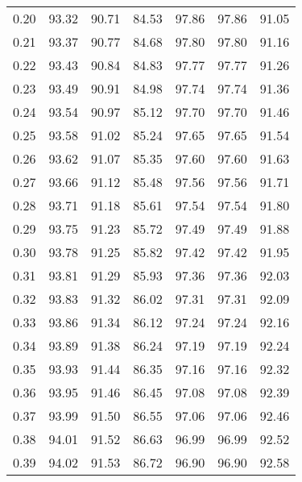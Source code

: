 \begin{tabular}{|c|c|c|c|c|c|c|}
      0.20 &     93.32 &     90.71 &      84.53 &   97.86 &      97.86 &         91.05 \\
      0.21 &     93.37 &     90.77 &      84.68 &   97.80 &      97.80 &         91.16 \\
      0.22 &     93.43 &     90.84 &      84.83 &   97.77 &      97.77 &         91.26 \\
      0.23 &     93.49 &     90.91 &      84.98 &   97.74 &      97.74 &         91.36 \\
      0.24 &     93.54 &     90.97 &      85.12 &   97.70 &      97.70 &         91.46 \\
      0.25 &     93.58 &     91.02 &      85.24 &   97.65 &      97.65 &         91.54 \\
      0.26 &     93.62 &     91.07 &      85.35 &   97.60 &      97.60 &         91.63 \\
      0.27 &     93.66 &     91.12 &      85.48 &   97.56 &      97.56 &         91.71 \\
      0.28 &     93.71 &     91.18 &      85.61 &   97.54 &      97.54 &         91.80 \\
      0.29 &     93.75 &     91.23 &      85.72 &   97.49 &      97.49 &         91.88 \\
      0.30 &     93.78 &     91.25 &      85.82 &   97.42 &      97.42 &         91.95 \\
      0.31 &     93.81 &     91.29 &      85.93 &   97.36 &      97.36 &         92.03 \\
      0.32 &     93.83 &     91.32 &      86.02 &   97.31 &      97.31 &         92.09 \\
      0.33 &     93.86 &     91.34 &      86.12 &   97.24 &      97.24 &         92.16 \\
      0.34 &     93.89 &     91.38 &      86.24 &   97.19 &      97.19 &         92.24 \\
      0.35 &     93.93 &     91.44 &      86.35 &   97.16 &      97.16 &         92.32 \\
      0.36 &     93.95 &     91.46 &      86.45 &   97.08 &      97.08 &         92.39 \\
      0.37 &     93.99 &     91.50 &      86.55 &   97.06 &      97.06 &         92.46 \\
      0.38 &     94.01 &     91.52 &      86.63 &   96.99 &      96.99 &         92.52 \\
      0.39 &     94.02 &     91.53 &      86.72 &   96.90 &      96.90 &         92.58 \\

\end{tabular}
